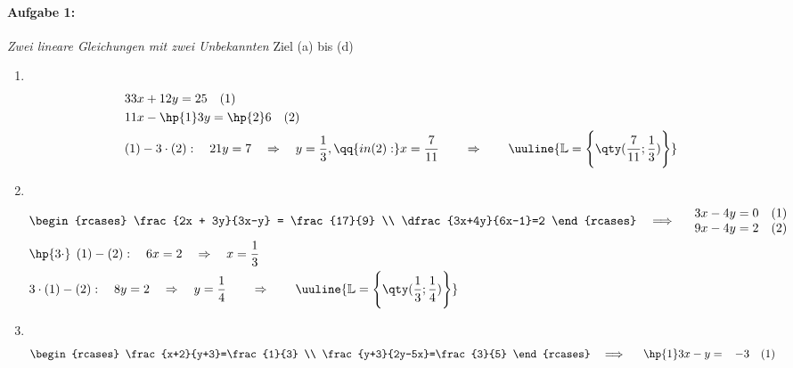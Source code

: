 \paragraph{Aufgabe 1: } \emph{Zwei lineare Gleichungen mit zwei Unbekannten} \hfill Ziel (a) bis (d)\\[0.2cm]
\begin{enumerate}[label=(\alph*)]
    \item $~$\\[-1.45 cm]\begin{align*}
        &33x+12y=25 \quad (1) \\ 
        &11x-\hp{1}3y=\hp{2}6 \quad (2) \\
        &(1) - 3\cdot (2): \quad 21y = 7 \quad\Rightarrow \quad y = \frac{1}{3}, \qq{in (2):} x = \frac{7}{11} \qquad \Rightarrow \qquad \uuline{\mathbb{L} = \Bigg\{\qty(\frac{7}{11};\frac{1}{3})\Bigg\}}
    \end{align*}
    \item $~$\\[-1.45cm] 
    \begin{align*}
        &\begin{rcases}
            \frac{2x + 3y}{3x-y} = \frac{17}{9} \\
            \dfrac{3x+4y}{6x-1}=2
        \end{rcases} \quad \Longrightarrow \quad 
        \begin{array}{l}
            3x-4y = 0 \quad (1) \\
            9x -4y = 2 \quad (2)
        \end{array} \\
        &\hp{3\cdot}\;\,(1) -(2): \quad 6x = 2 \quad\Rightarrow\quad x = \frac{1}{3}\\
        &3\cdot(1) -(2): \quad 8y = 2 \quad\Rightarrow\quad y = \frac{1}{4} \qquad \Rightarrow \qquad \uuline{\mathbb{L} = \Bigg\{\qty(\frac{1}{3};\frac{1}{4})\Bigg\}}
    \end{align*}
    \item $~$\\[-1.45cm] 
    \begin{align*}
        &\begin{rcases}
            \frac{x+2}{y+3}=\frac{1}{3} \\
            \frac{y+3}{2y-5x}=\frac{3}{5}
        \end{rcases} \quad \Longrightarrow \quad 
        \begin{array}{l}
            \hp{1}3x-y = \;\;\;-3 \quad (1) \\

\end{array}
\end{align*}
\end{enumerate}
